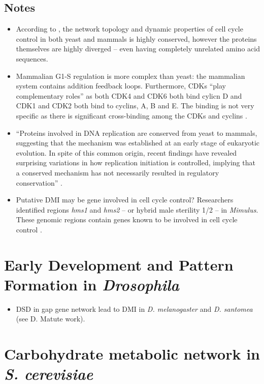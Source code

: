 \documentclass[11 pt]{article}
\begin{document}
      \subsection{Notes}
      \begin{itemize}
        \item According to \citet{cross2011evolution}, the network topology and dynamic properties of cell cycle control in both yeast and mammals is highly conserved, however the proteins themselves are highly diverged -- even having completely unrelated amino acid sequences.
        \item Mammalian G1-S regulation is more complex than yeast: the mammalian system contains addition feedback loops. Furthermore, CDKs ``play complementary roles'' as both CDK4 and CDK6 both bind cylicn D and CDK1 and CDK2 both bind to cyclins, A, B and E. The binding is not very specific as there is significant cross-binding among the CDKs and cyclins \citep{cross2011evolution}.
        \item ``Proteins involved in DNA replication are conserved from yeast to mammals, suggesting that the mechanism was established at an early stage of eukaryotic evolution. In spite of this common origin, recent findings have revealed surprising variations in how replication initiation is controlled, implying that a conserved mechanism has not necessarily resulted in regulatory conservation'' \citep{kearsey2003enigmatic}.
        \item Putative DMI may be gene involved in cell cycle control? Researchers identified regions \emph{hms1} and \emph{hms2} -- or hybrid male sterility 1/2 -- in \emph{Mimulus}. These genomic regions contain genes known to be involved in cell cycle control \citep{sweigart2015evidence}.
      \end{itemize}
    \section{Early Development and Pattern Formation in \emph{Drosophila}}
    \begin{itemize}
      \item DSD in gap gene network lead to DMI in \emph{D. melanogaster} and \emph{D. santomea} (see D. Matute work). 
    \end{itemize}
    \section{Carbohydrate metabolic network in \emph{S. cerevisiae}}
\end{document}
